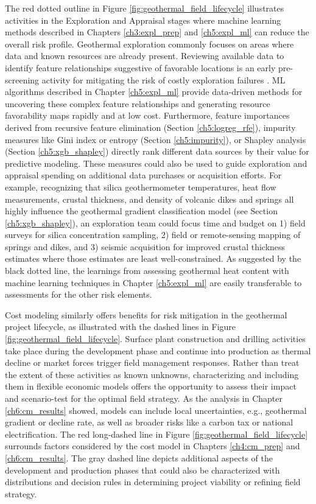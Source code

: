 The red dotted outline in Figure \ref{fig:geothermal_field_lifecycle} illustrates activities in the Exploration and Appraisal stages where machine learning methods described in Chapters \ref{ch3:expl_prep} and \ref{ch5:expl_ml} can reduce the overall risk profile. Geothermal exploration commonly focuses on areas where data and known resources are already present. Reviewing available data to identify feature relationships suggestive of favorable locations is an early pre-screening activity for mitigating the risk of costly exploration failures \citep{doughty_geovision_2018}. ML algorithms described in Chapter \ref{ch5:expl_ml} provide data-driven methods for uncovering these complex feature relationships and generating resource favorability maps rapidly and at low cost. Furthermore, feature importances derived from recursive feature elimination (Section \ref{ch5:logreg_rfe}), impurity measures like Gini index or entropy (Section \ref{ch5:impurity}), or Shapley analysis (Section \ref{ch5:xgb_shapley}) directly rank different data sources by their value for predictive modeling. These measures could also be used to guide exploration and appraisal spending on additional data purchases or acquisition efforts. For example, recognizing that silica geothermometer temperatures, heat flow measurements, crustal thickness, and density of volcanic dikes and springs all highly influence the geothermal gradient classification model (see Section \ref{ch5:xgb_shapley}), an exploration team could focus time and budget on 1) field surveys for silica concentration sampling, 2) field or remote-sensing mapping of springs and dikes, and 3) seismic acquisition for improved crustal thickness estimates where those estimates are least well-constrained. As suggested by the black dotted line, the learnings from assessing geothermal heat content with machine learning techniques in Chapter \ref{ch5:expl_ml} are easily transferable to assessments for the other risk elements. 

Cost modeling similarly offers benefits for risk mitigation in the geothermal project lifecycle, as illustrated with the dashed lines in Figure \ref{fig:geothermal_field_lifecycle}. Surface plant construction and drilling activities take place during the development phase and continue into production as thermal decline or market forces trigger field management responses. Rather than treat the extent of these activities as known unknowns, characterizing and including them in flexible economic models offers the opportunity to assess their impact and scenario-test for the optimal field strategy. As the analysis in Chapter \ref{ch6:cm_results} showed, models can include local uncertainties, e.g., geothermal gradient or decline rate, as well as broader risks like a carbon tax or national electrification. The red long-dashed line in Figure \ref{fig:geothermal_field_lifecycle} surrounds factors considered by the cost model in Chapters \ref{ch4:cm_prep} and \ref{ch6:cm_results}. The gray dashed line depicts additional aspects of the development and production phases that could also be characterized with distributions and decision rules in determining project viability or refining field strategy.

